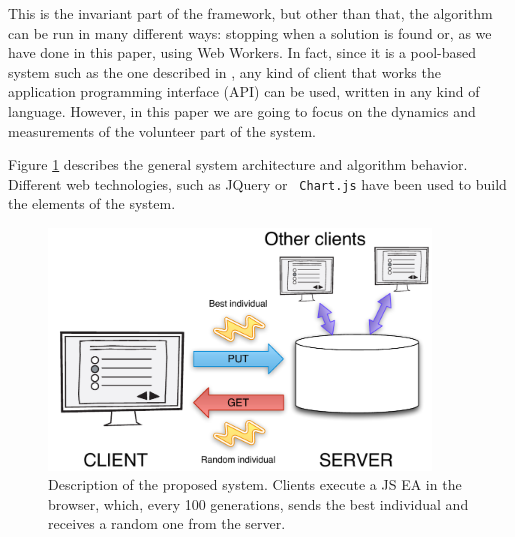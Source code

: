 \documentclass[journal,onecolumn]{IEEEtran}
\begin{document}
  This is the invariant part of the framework, but other than that,
  the algorithm can be run in many different ways: 
  stopping when a solution is found or, as we have done in this paper,
  using Web Workers. In fact, since it is a pool-based system such as
  the one described in \cite{LNCS86720702}, any kind of client that
  works the application programming interface (API) can be used,
  written in any kind of language. However, in this paper we are going
  to focus on the dynamics and measurements of the volunteer part of
  the system. 


Figure \ref{fig:system} describes the general system architecture and
algorithm behavior. Different web technologies, such as JQuery or {\tt
  Chart.js} have
been used to build the elements of the system.
\begin{figure}[!t]
\centering
\includegraphics[width=4in]{system.pdf}
\caption{Description of the proposed system. Clients execute a JS EA
  in the browser, which, every 100 generations, sends the best
  individual and receives a random one from the server.}
\label{fig:system}
\end{figure}
\end{document}
